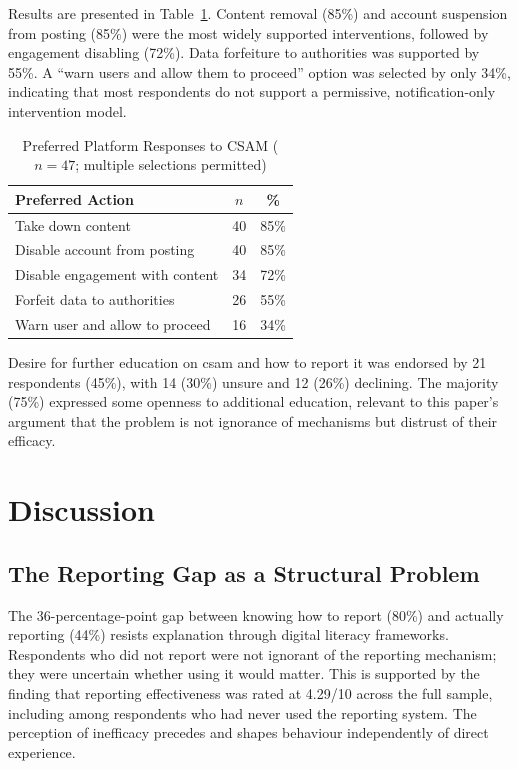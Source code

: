 \documentclass{ieee-portfolio}
\begin{document}
Results are presented in Table~\ref{tab:policy}. Content removal (85\%) and account suspension from posting (85\%) were the most widely supported interventions, followed by engagement disabling (72\%). Data forfeiture to authorities was supported by 55\%. A ``warn users and allow them to proceed'' option was selected by only 34\%, indicating that most respondents do not support a permissive, notification-only intervention model.
 
\begin{table}[!ht]
\centering
\caption{Preferred Platform Responses to CSAM ($n = 47$; multiple selections permitted)}
\label{tab:policy}
\renewcommand{\arraystretch}{1.2}
\begin{tabular}{lcc}
\toprule
\textbf{Preferred Action} & \textbf{$n$} & \textbf{\%} \\
\midrule
Take down content                & 40 & 85\% \\
Disable account from posting     & 40 & 85\% \\
Disable engagement with content  & 34 & 72\% \\
Forfeit data to authorities      & 26 & 55\% \\
Warn user and allow to proceed   & 16 & 34\% \\
\bottomrule
\end{tabular}
\end{table}
 
Desire for further education on \gls{csam} and how to report it was endorsed by 21 respondents (45\%), with 14 (30\%) unsure and 12 (26\%) declining. The majority (75\%) expressed some openness to additional education, relevant to this paper's argument that the problem is not ignorance of mechanisms but distrust of their efficacy.
 
\section{Discussion}
 
\subsection{The Reporting Gap as a Structural Problem}
 
The 36-percentage-point gap between knowing how to report (80\%) and actually reporting (44\%) resists explanation through digital literacy frameworks. Respondents who did not report were not ignorant of the reporting mechanism; they were uncertain whether using it would matter. This is supported by the finding that reporting effectiveness was rated at 4.29/10 across the full sample, including among respondents who had never used the reporting system. The perception of inefficacy precedes and shapes behaviour independently of direct experience.
 
\end{document}
